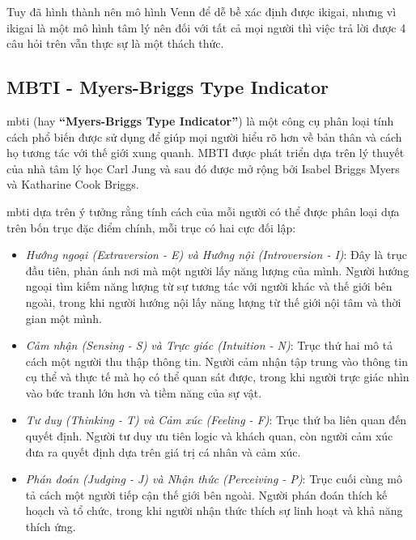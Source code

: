 Tuy đã hình thành nên mô hình Venn để dễ bề xác định được ikigai, nhưng vì ikigai là một mô hình tâm lý nên đối với tất cả mọi người thì việc trả lời được 4 câu hỏi trên vẫn thực sự là một thách thức.

\subsection{MBTI - Myers-Briggs Type Indicator}
\acrshort{mbti} (hay \textbf{“Myers-Briggs Type Indicator”}) là một công cụ phân loại tính cách phổ biến được sử dụng để giúp mọi người hiểu rõ hơn về bản thân và cách họ tương tác với thế giới xung quanh. MBTI được phát triển dựa trên lý thuyết của nhà tâm lý học Carl Jung \cite{jung} và sau đó được mở rộng bởi Isabel Briggs Myers và Katharine Cook Briggs.

\acrshort{mbti} dựa trên ý tưởng rằng tính cách của mỗi người có thể được phân loại dựa trên bốn trục đặc điểm chính, mỗi trục có hai cực đối lập:

\begin{itemize}
    \item \textit{Hướng ngoại (Extraversion - E) và Hướng nội (Introversion - I)}: Đây là trục đầu tiên, phản ánh nơi mà một người lấy năng lượng của mình. Người hướng ngoại tìm kiếm năng lượng từ sự tương tác với người khác và thế giới bên ngoài, trong khi người hướng nội lấy năng lượng từ thế giới nội tâm và thời gian một mình.
    \item \textit{Cảm nhận (Sensing - S) và Trực giác (Intuition - N)}: Trục thứ hai mô tả cách một người thu thập thông tin. Người cảm nhận tập trung vào thông tin cụ thể và thực tế mà họ có thể quan sát được, trong khi người trực giác nhìn vào bức tranh lớn hơn và tiềm năng của sự vật.
    \item \textit{Tư duy (Thinking - T) và Cảm xúc (Feeling - F)}: Trục thứ ba liên quan đến quyết định. Người tư duy ưu tiên logic và khách quan, còn người cảm xúc đưa ra quyết định dựa trên giá trị cá nhân và cảm xúc.
    \item \textit{Phán đoán (Judging - J) và Nhận thức (Perceiving - P)}: Trục cuối cùng mô tả cách một người tiếp cận thế giới bên ngoài. Người phán đoán thích kế hoạch và tổ chức, trong khi người nhận thức thích sự linh hoạt và khả năng thích ứng.
\end{itemize}

